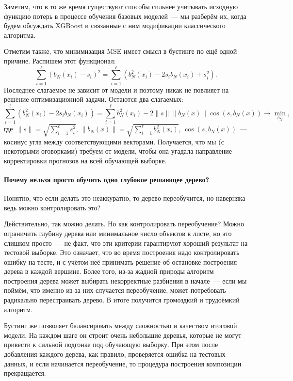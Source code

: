 \documentclass[12pt,fleqn]{article}
\begin{document}
Заметим, что в то же время существуют способы сильнее учитывать исходную функцию потерь
в процессе обучения базовых моделей~--- мы разберём их, когда будем обсуждать XGBoost и связанные с ним
модификации классического алгоритма.

Отметим также, что минимизация MSE имеет смысл в бустинге по ещё одной причине.
Распишем этот функционал:
\[
    \sum_{i = 1}^{\ell}
        (b_N(x_i) - s_i)^2
    =
    \sum_{i = 1}^{\ell}
        (b_N^2(x_i)
        -
        2 s_i b_N(x_i)
        +
        s_i^2).
\]
Последнее слагаемое не зависит от модели и поэтому никак не повлияет на решение оптимизационной задачи.
Остаются два слагаемых:
\[
    \sum_{i = 1}^{\ell}
        (b_N^2(x_i)
        -
        2 s_i b_N(x_i))
    =
    \sum_{i = 1}^{\ell}
        b_N^2(x_i)
    -
    2
    \|s\|
    \|b_N(x)\|
    \cos(s, b_N(x))
    \to
    \min_{b_N},
\]
где~$\|s\| = \sqrt{\sum_{i = 1}^{\ell} s_i^2}$,
$\|b_N(x)\| = \sqrt{\sum_{i = 1}^{\ell} b_N^2(x_i)}$,
$\cos(s, b_N(x))$~--- косинус угла между соответствующими векторами.
Получается, что мы (с некоторыми оговорками) требуем от модели, чтобы она угадала направление
корректировки прогнозов на всей обучающей выборке.

\paragraph{Почему нельзя просто обучить одно глубокое решающее дерево?}
Понятно, что если делать это неаккуратно, то дерево переобучится, но наверняка ведь можно
контролировать это?

Действительно, так можно делать. Но как контролировать переобучение?
Можно ограничить глубину дерева или минимальное число объектов в листе, но это слишком просто~---
не факт, что эти критерии гарантируют хороший результат на тестовой выборке.
Это означает, что во время построения надо контролировать ошибку на тесте,
и с учётом неё принимать решение об остановке построения дерева в каждой вершине.
Более того, из-за жадной природы алгоритм построения дерева может выбирать некорректные
разбиения в начале~--- если мы поймём, что именно из-за них случается переобучение, может
потребовать радикально перестраивать дерево.
В итоге получится громоздкий и трудоёмкий алгоритм.

Бустинг же позволяет балансировать между сложностью и качеством итоговой модели.
На каждом шаге он строит очень небольшие деревья, которые не могут привести к сильной подгонке под
обучающую выборку.
При этом после добавления каждого дерева, как правило, проверяется ошибка на тестовых данных,
и если начинается переобучение, то процедура построения композиции прекращается.
\end{document}

